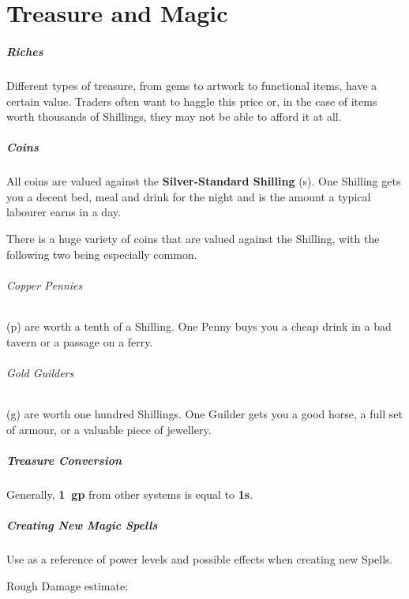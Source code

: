 \documentclass[itdr/core]{subfiles}
\begin{document}
\chapter{Treasure and Magic}
\label{ch:treasure_and_magic}

\paragraph{Riches}
Different types of treasure, from gems to artwork to functional items, have a certain value. Traders often want to haggle this price or, in the case of items worth thousands of Shillings, they may not be able to afford it at all.

\paragraph{Coins}
All coins are valued against the \textbf{Silver-Standard Shilling} (s). One Shilling gets you a decent bed, meal and drink for the night and is the amount a typical labourer earns in a day.

There is a huge variety of coins that are valued against the Shilling, with the following two being especially common.\tight

\subparagraph{Copper Pennies} (p) are worth a tenth of a Shilling. One Penny buys you a cheap drink in a bad tavern or a passage on a ferry.

\subparagraph{Gold Guilders} (g) are worth one hundred Shillings. One Guilder gets you a good horse, a full set of armour, or a valuable piece of jewellery.

\begin{dbox}
	\paragraph{Treasure Conversion}
	Generally, \textbf{1~gp} from other systems is equal to \textbf{1s}.
\end{dbox}

\vfill

\paragraph{Creating New Magic Spells}
Use \textbf{} as a reference of power levels and possible effects when creating new Spells.

Rough Damage estimate:
\end{document}
